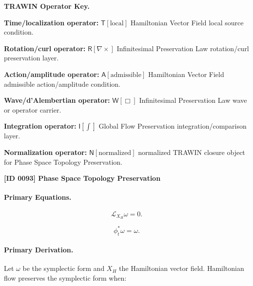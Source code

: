 \par\vspace{0.45\baselineskip}
\noindent\begin{minipage}[t]{\linewidth}
\begingroup
\small
\raggedright
\textbf{TRAWIN Operator Key.}\par
\noindent\textbf{Time/localization operator:} $\mathsf{T}\!\left[\mathrm{local}\right]$ Hamiltonian Vector Field local source condition.\par
\noindent\textbf{Rotation/curl operator:} $\mathsf{R}\!\left[\nabla\times\right]$ Infinitesimal Preservation Law rotation/curl preservation layer.\par
\noindent\textbf{Action/amplitude operator:} $\mathsf{A}\!\left[\mathrm{admissible}\right]$ Hamiltonian Vector Field admissible action/amplitude condition.\par
\noindent\textbf{Wave/d'Alembertian operator:} $\mathsf{W}\!\left[\Box\right]$ Infinitesimal Preservation Law wave or operator carrier.\par
\noindent\textbf{Integration operator:} $\mathsf{I}\!\left[\int\right]$ Global Flow Preservation integration/comparison layer.\par
\noindent\textbf{Normalization operator:} $\mathsf{N}\!\left[\mathrm{normalized}\right]$ normalized TRAWIN closure object for Phase Space Topology Preservation.\par
\endgroup
\end{minipage}

\clearpage
\noindent\textbf{[ID 0093] Phase Space Topology Preservation}\par
\vspace{0.35em}
\paragraph{Primary Equations.}
\begin{equation}
\mathcal{L}_{X_H}\omega=0.
\end{equation}

\begin{equation}
\phi_t^{*}\omega=\omega.
\end{equation}

\paragraph{Primary Derivation.}
Let $\omega$ be the symplectic form and $X_H$ the Hamiltonian vector field.  
Hamiltonian flow preserves the symplectic form when:

